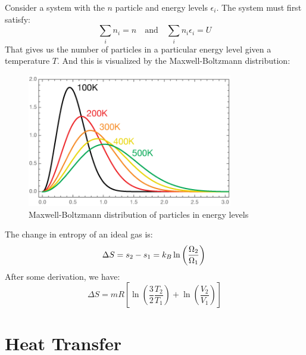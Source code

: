 \documentclass[11pt]{report}
\begin{document}
\begin{definition}
    Consider a system with the $n$ particle and energy levels $\epsilon_i$. The system must first satisfy:
    $$
        \sum_i n_i = n \quad \text{and} \quad \sum_i n_i \epsilon_i = U
    $$ 
    That gives us the number of particles in a particular energy level given a temperature $T$. And this is visualized by the Maxwell-Boltzmann distribution:
    \begin{figure}[h!]
        \centering
        \includegraphics[width=0.8\textwidth]{MBGraph2.png}
        \caption{Maxwell-Boltzmann distribution of particles in energy levels}
    \end{figure}
\end{definition}
\begin{definition}
    The change in entropy of an ideal gas is:
    \begin{equation}
        \Delta S = s_2 - s_1 = k_B \ln\left(\frac{\Omega_2}{\Omega_1}\right) \\
    \end{equation}
    After some derivation, we have:
    \begin{equation}
        \Delta S = mR \left[ \ln\left(\frac{3}{2} \frac{T_2}{T_1}\right) + \ln\left(\frac{V_2}{V_1}\right) \right]
    \end{equation}
\end{definition}
\chapter{Heat Transfer}
\end{document}
